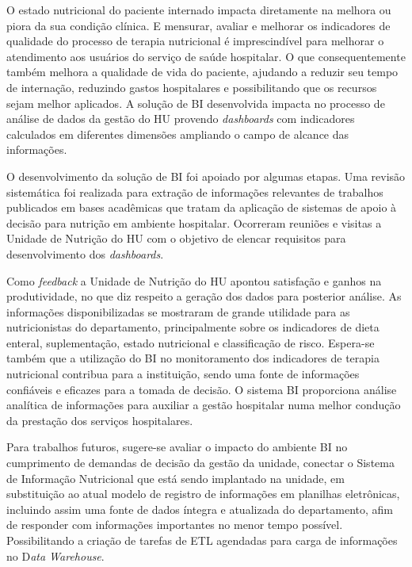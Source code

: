 O estado nutricional do paciente internado impacta diretamente na melhora ou piora da sua condição clínica. E mensurar, avaliar e melhorar os indicadores de qualidade do processo de terapia nutricional é imprescindível para melhorar o atendimento aos usuários do serviço de saúde hospitalar. O que consequentemente também melhora a qualidade de vida do paciente, ajudando a reduzir seu tempo de internação, reduzindo gastos hospitalares e possibilitando que os recursos sejam melhor aplicados. A solução de BI desenvolvida impacta no processo de análise de dados da gestão do HU provendo \textit{dashboards} com indicadores calculados em diferentes dimensões ampliando o campo de alcance das informações.

O desenvolvimento da solução de BI foi apoiado por algumas etapas. Uma revisão sistemática foi realizada para extração de informações relevantes de trabalhos publicados em bases acadêmicas que tratam da aplicação de sistemas de apoio à decisão para nutrição em ambiente hospitalar. Ocorreram reuniões e visitas a Unidade de Nutrição do HU com o objetivo de elencar requisitos para desenvolvimento dos \textit{dashboards}. 

Como \textit{feedback} a Unidade de Nutrição do HU apontou satisfação e ganhos na produtividade, no que diz respeito a geração dos dados para posterior análise. As informações disponibilizadas se mostraram de grande utilidade para as nutricionistas do departamento, principalmente sobre os indicadores de dieta enteral, suplementação, estado nutricional e classificação de risco. Espera-se também que a utilização do BI no monitoramento dos indicadores de terapia nutricional contribua para a instituição, sendo uma fonte de informações confiáveis e eficazes para a tomada de decisão. O sistema BI proporciona análise analítica de informações para auxiliar a gestão hospitalar numa melhor condução da prestação dos serviços hospitalares.

Para trabalhos futuros, sugere-se avaliar o impacto do ambiente BI no cumprimento de demandas de decisão da gestão da unidade, conectar o Sistema de Informação Nutricional que está sendo implantado na unidade, em substituição ao atual modelo de registro de informações em planilhas eletrônicas, incluindo assim uma fonte de dados íntegra e atualizada do departamento, afim de responder com informações importantes no menor tempo possível. Possibilitando a criação de tarefas de ETL agendadas para carga de informações no D\textit{ata Warehouse}.